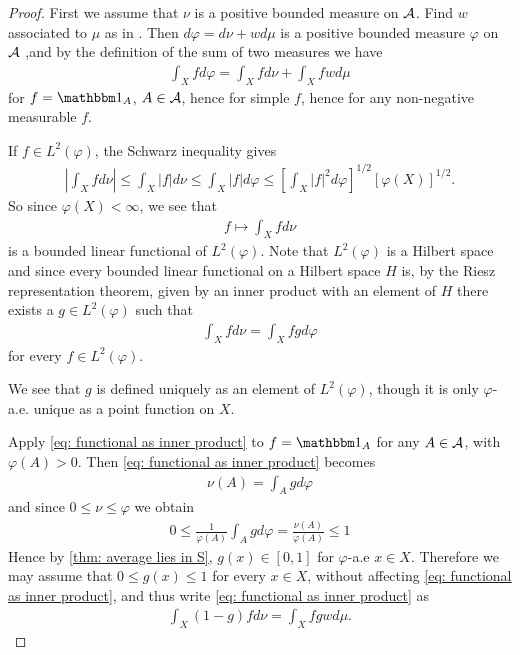 \begin{proof}
First we assume that $\nu$ is a positive bounded measure on $\mathcal{A}$. Find $w$ associated to $\mu$ as in . Then $d\varphi=d\nu+wd\mu$ is a positive bounded measure $\varphi$ on $\mathcal{A}$ ,and by the definition of the sum of two measures we have
\begin{align*}
	\int_{X}fd\varphi = \int_{X}fd\nu + \int_{X}fwd\mu
\end{align*}
for $f=\ind{A}$, $A\in \mathcal{A}$, hence for simple $f$, hence for any non-negative measurable $f$.

If $f\in L^{2}(\varphi)$, the Schwarz inequality gives
\begin{align*}
	\left|\int_{X}fd\nu \right| \le \int_{X} |f|d\nu \le \int_{X}|f|d\varphi \le \left[ \int_{X}|f|^{2}d\varphi \right]^{1/2} [\varphi(X)]^{1/2}.
\end{align*}
So since $\varphi(X)<\infty$, we see that
\begin{align*}
	f\mapsto \int_{X}fd\nu
\end{align*}
is a bounded linear functional of $L^{2}(\varphi)$. Note that $L^{2}(\varphi)$ is a Hilbert space and since every bounded linear functional on a Hilbert space $H$ is, by the Riesz representation theorem, given by an inner product with an element of $H$ there exists a $g\in L^{2}(\varphi)$ such that
\begin{align}
	\int_{X}fd\nu=\int_{X}fgd\varphi \label{eq: functional as inner product}
\end{align}
for every $f\in L^{2}(\varphi)$.

We see that $g$ is defined uniquely as an element of $L^{2}(\varphi)$, though it is only $\varphi$-a.e. unique as a point function on $X$.

Apply \eqref{eq: functional as inner product} to $f=\ind{A}$ for any $A\in \mathcal{A}$, with $\varphi(A)>0$. Then \eqref{eq: functional as inner product} becomes
\begin{align*}
	\nu(A)=\int_{A}gd\varphi
\end{align*}
and since $0\le \nu \le \varphi$ we obtain
\begin{align*}
	0\le \frac{1}{\varphi(A)}\int_{A}gd\varphi=\frac{\nu(A)}{\varphi(A)}\le 1
\end{align*}
Hence by \cref{thm: average lies in S}, $g(x)\in [0,1]$ for $\varphi$-a.e $x\in X$.
Therefore we may assume that $0\le g(x) \le 1$ for every $x\in X$, without affecting \eqref{eq: functional as inner product}, and thus write \eqref{eq: functional as inner product} as
\begin{align}
	\int_{X}(1-g)fd\nu=\int_{X}fgwd\mu. \label{eq: rewriting}
\end{align}


\end{proof}
